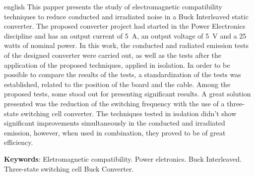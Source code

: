 \begin{resumo}[Abstract]
	\begin{otherlanguage*}{english}
		This papper presents the study of electromagnetic compatibility techniques to reduce conducted and irradiated noise in a Buck Interleaved static converter. The proposed converter project had started in the Power Electronics discipline and has an output current of \SI{5}{\ampere}, an output voltage of \SI{5}{\volt} and a 25 watts of nominal power. In this work, the conducted and radiated emission tests of the designed converter were carried out, as well as the tests after the application of the proposed techniques, applied in isolation. In order to be possible to compare the results of the tests, a standardization of the tests was established, related to the position of the board and the cable. Among the proposed tests, some stood out for presenting significant results. A great solution presented was the reduction of the switching frequency with the use of a three-state switching cell converter. The techniques tested in isolation didn't show significant improvements simultaneously in the conducted and irradiated emission, however, when used in combination, they proved to be of great efficiency.
		
		\vspace{\onelineskip}
		
		\noindent 
		\textbf{Keywords}: Eletromagnetic compatibility. Power eletronics. Buck Interleaved. Three-state switching cell Buck Converter.
	\end{otherlanguage*}
\end{resumo}
